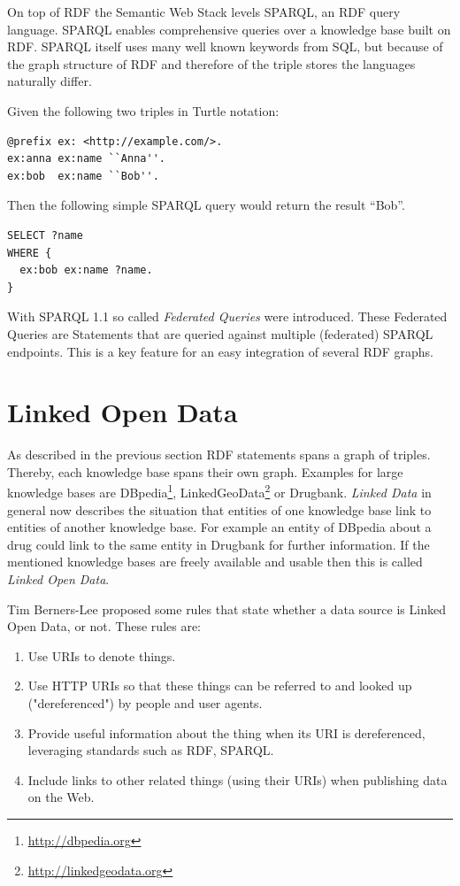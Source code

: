 On top of RDF the Semantic Web Stack levels SPARQL, an RDF query language.
SPARQL enables comprehensive queries over a knowledge base built on RDF.
SPARQL itself uses many well known keywords from SQL, but because of the graph structure of RDF and therefore of the triple stores the languages naturally differ.

Given the following two triples in Turtle notation:
\begin{lstlisting}[numbers=none,label=turtle]
@prefix ex: <http://example.com/>.
ex:anna ex:name ``Anna''.
ex:bob  ex:name ``Bob''. 
\end{lstlisting}

Then the following simple SPARQL query would return the result ``Bob''.
\begin{lstlisting}[numbers=none,label=sparql]
SELECT ?name
WHERE {
  ex:bob ex:name ?name.
}
\end{lstlisting}

With SPARQL 1.1 so called \textit{Federated Queries} were introduced.
These Federated Queries are Statements that are queried against multiple (federated) SPARQL endpoints.
This is a key feature for an easy integration of several RDF graphs.

\section{Linked Open Data}
\label{sec:linked-open-data}
As described in the previous section RDF statements spans a graph of triples.
Thereby, each knowledge base spans their own graph.
Examples for large knowledge bases are DBpedia\footnote{\url{http://dbpedia.org}}, LinkedGeoData\footnote{\url{http://linkedgeodata.org}} or Drugbank.
\textit{Linked Data} in general now describes the situation that entities of one knowledge base link to entities of another knowledge base.
For example an entity of DBpedia about a drug could link to the same entity in Drugbank for further information.
If the mentioned knowledge bases are freely available and usable then this is called \textit{Linked Open Data}.

Tim Berners-Lee proposed some rules that state whether a data source is Linked Open Data, or not.
These rules are:
\begin{enumerate}
\item Use URIs to denote things.
\item Use HTTP URIs so that these things can be referred to and looked up ("dereferenced") by people and user agents.
\item Provide useful information about the thing when its URI is dereferenced, leveraging standards such as RDF, SPARQL.
\item Include links to other related things (using their URIs) when publishing data on the Web.
\end{enumerate}

